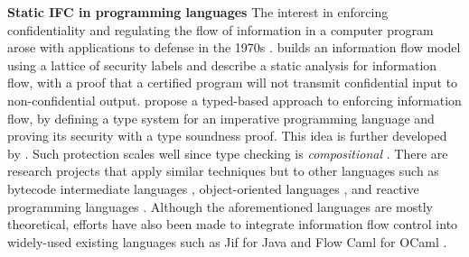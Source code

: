 
\textbf{Static IFC in programming languages} The interest in enforcing
confidentiality and regulating the flow of information in a computer program
arose with applications to defense in the 1970s \autocite{bell1976secure}.
\textcite{denning1976lattice} builds an information flow model using a lattice of
security labels and \textcite{denning1977certification} describe
a static analysis for information flow, with a proof that a certified program
will not transmit confidential input to non-confidential output.
\textcite{volpano1996sound} propose a typed-based approach to enforcing
information flow, by defining a type system for an imperative programming
language and proving its security with a type soundness proof.
This idea is
further developed by \textcite{zdancewic2002programming}. Such protection
scales well since type checking is \textit{compositional}
\parencite{sabelfeld2003language}.
There are research projects that apply similar
techniques but to other languages such as bytecode intermediate languages
\autocite{barthe2005non}, object-oriented languages \autocite{amtoft2006logic},
and reactive programming languages \autocite{bohannon2009reactive}. Although the
aforementioned languages are mostly theoretical, efforts have also been made to
integrate information flow control into widely-used existing languages such as
Jif for Java \autocite{myers1999jflow} and Flow Caml for OCaml
\autocite{pottier2002information, simonet2003flow}.

